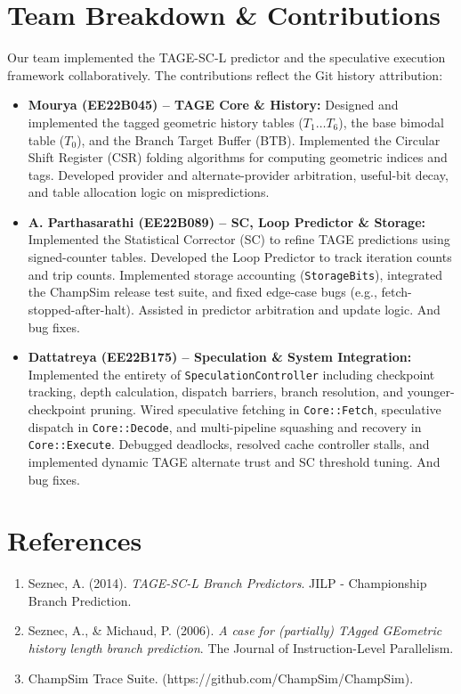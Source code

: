 \documentclass[11pt, a4paper]{article}
\begin{document}
\section{Team Breakdown \& Contributions}

Our team implemented the TAGE-SC-L predictor and the speculative execution framework collaboratively. The contributions reflect the Git history attribution:

\begin{itemize}[leftmargin=2em]
    \item \textbf{Mourya (EE22B045) -- TAGE Core \& History:} 
    Designed and implemented the tagged geometric history tables ($T_1 \dots T_6$), the base bimodal table ($T_0$), and the Branch Target Buffer (BTB). Implemented the Circular Shift Register (CSR) folding algorithms for computing geometric indices and tags. Developed provider and alternate-provider arbitration, useful-bit decay, and table allocation logic on mispredictions.
    
    \item \textbf{A. Parthasarathi (EE22B089) -- SC, Loop Predictor \& Storage:} 
    Implemented the Statistical Corrector (SC) to refine TAGE predictions using signed-counter tables. Developed the Loop Predictor to track iteration counts and trip counts. Implemented storage accounting (\texttt{StorageBits}), integrated the ChampSim release test suite, and fixed edge-case bugs (e.g., fetch-stopped-after-halt). Assisted in predictor arbitration and update logic. And bug fixes.
    
    \item \textbf{Dattatreya (EE22B175) -- Speculation \& System Integration:} 
    Implemented the entirety of \texttt{SpeculationController} including checkpoint tracking, depth calculation, dispatch barriers, branch resolution, and younger-checkpoint pruning. Wired speculative fetching in \texttt{Core::Fetch}, speculative dispatch in \texttt{Core::Decode}, and multi-pipeline squashing and recovery in \texttt{Core::Execute}. Debugged deadlocks, resolved cache controller stalls, and implemented dynamic TAGE alternate trust and SC threshold tuning. And bug fixes.
\end{itemize}

\section{References}
\begin{enumerate}
    \item Seznec, A. (2014). \textit{TAGE-SC-L Branch Predictors}. JILP - Championship Branch Prediction.
    \item Seznec, A., \& Michaud, P. (2006). \textit{A case for (partially) TAgged GEometric history length branch prediction}. The Journal of Instruction-Level Parallelism.
    \item ChampSim Trace Suite. (https://github.com/ChampSim/ChampSim).
\end{enumerate}
\end{document}

